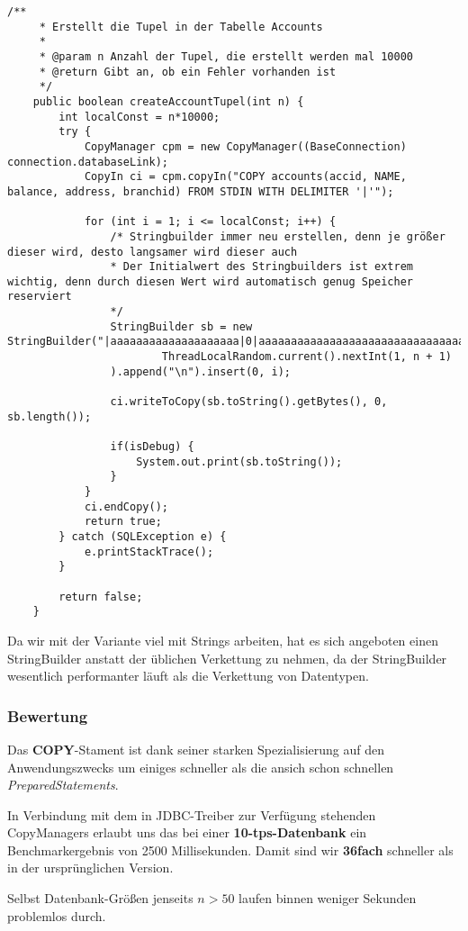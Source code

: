 \begin{lstlisting}[caption={createAccountTupel mit CopyManager}]
	/**
	 * Erstellt die Tupel in der Tabelle Accounts
	 * 
	 * @param n Anzahl der Tupel, die erstellt werden mal 10000
	 * @return Gibt an, ob ein Fehler vorhanden ist
	 */
	public boolean createAccountTupel(int n) {
		int localConst = n*10000;
		try {
			CopyManager cpm = new CopyManager((BaseConnection) connection.databaseLink);
			CopyIn ci = cpm.copyIn("COPY accounts(accid, NAME, balance, address, branchid) FROM STDIN WITH DELIMITER '|'");
			
			for (int i = 1; i <= localConst; i++) {
				/* Stringbuilder immer neu erstellen, denn je größer dieser wird, desto langsamer wird dieser auch
				* Der Initialwert des Stringbuilders ist extrem wichtig, denn durch diesen Wert wird automatisch genug Speicher reserviert
				*/
				StringBuilder sb = new StringBuilder("|aaaaaaaaaaaaaaaaaaaa|0|aaaaaaaaaaaaaaaaaaaaaaaaaaaaaaaaaaaaaaaaaaaaaaaaaaaaaaaaaaaaaaaaaaaa|").append(
						ThreadLocalRandom.current().nextInt(1, n + 1)
				).append("\n").insert(0, i);
				
				ci.writeToCopy(sb.toString().getBytes(), 0, sb.length());
				
				if(isDebug) {
					System.out.print(sb.toString());
				}
			}
	        ci.endCopy();			
			return true;
		} catch (SQLException e) {
			e.printStackTrace();
		}
		
		return false;
	}
\end{lstlisting}

Da wir mit der Variante viel mit Strings arbeiten, hat es sich angeboten einen
StringBuilder anstatt der üblichen Verkettung zu nehmen, da der StringBuilder
wesentlich performanter läuft als die Verkettung von Datentypen.

\subsubsection*{Bewertung}
Das \textbf{COPY}-Stament ist dank seiner starken Spezialisierung auf den
Anwendungszwecks um einiges schneller als die ansich schon schnellen
\textit{PreparedStatements}.

In Verbindung mit dem in JDBC-Treiber zur Verfügung stehenden CopyManagers
erlaubt uns das bei einer \textbf{10-tps-Datenbank} ein Benchmarkergebnis von
2500 Millisekunden. Damit sind wir \textbf{36fach} schneller als in der
ursprünglichen Version.

Selbst Datenbank-Größen jenseits $n > 50$ laufen binnen weniger Sekunden
problemlos durch.
\clearpage


